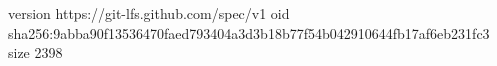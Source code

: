 version https://git-lfs.github.com/spec/v1
oid sha256:9abba90f13536470faed793404a3d3b18b77f54b042910644fb17af6eb231fc3
size 2398
